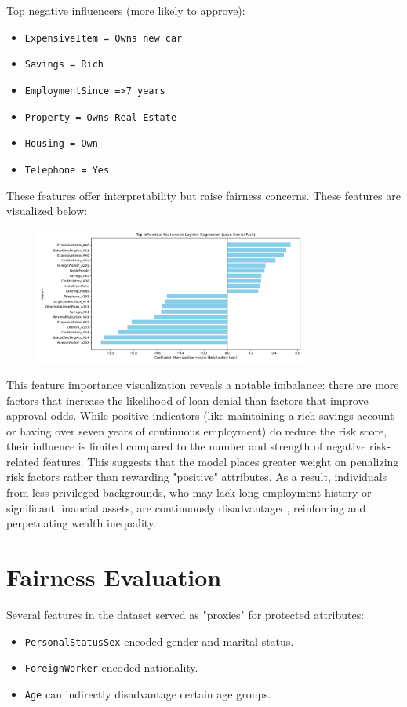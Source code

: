 \documentclass[12pt]{article}
\begin{document}
	Top negative influencers (more likely to approve):
	\begin{itemize}
		\item \texttt{ExpensiveItem = Owns new car}
		\item \texttt{Savings = Rich}
		\item \texttt{EmploymentSince =\textgreater 7 years}
		\item \texttt{Property = Owns Real Estate}
		\item \texttt{Housing = Own}
		\item \texttt{Telephone = Yes}
	\end{itemize}
	
	These features offer interpretability but raise fairness concerns. These features are visualized below:
	
	\begin{figure}[h]
		\centering
		\includegraphics[width=0.8\textwidth]{InfluentialFeatures.png}
		\label{fig:top_features}
	\end{figure}
	
	This feature importance visualization reveals a notable imbalance: there are more factors that increase the likelihood of loan denial than factors that improve approval odds. While positive indicators (like maintaining a rich savings account or having over seven years of continuous employment) do reduce the risk score, their influence is limited compared to the number and strength of negative risk-related features. This suggests that the model places greater weight on penalizing risk factors rather than rewarding "positive" attributes. As a result, individuals from less privileged backgrounds, who may lack long employment history or significant financial assets, are continuously disadvantaged, reinforcing and perpetuating wealth inequality.
	
	\section{Fairness Evaluation}
	Several features in the dataset served as "proxies" for protected attributes:
	\begin{itemize}
		\item \texttt{PersonalStatusSex} encoded gender and marital status.
		\item \texttt{ForeignWorker} encoded nationality.
		\item \texttt{Age} can indirectly disadvantage certain age groups.
	\end{itemize}
	
\end{document}
